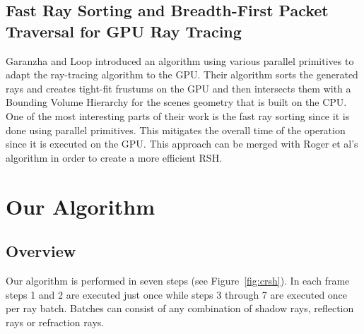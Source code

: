 \documentclass{egpubl}
\begin{document}
\subsection{Fast Ray Sorting and Breadth-First Packet Traversal for GPU Ray Tracing}

Garanzha and Loop \cite{Garanzha10} introduced an algorithm using various parallel primitives to adapt the ray-tracing algorithm to the GPU. Their algorithm sorts the generated rays and creates tight-fit frustums on the GPU and then intersects them with a Bounding Volume Hierarchy for the scenes geometry that is built on the CPU. One of the most interesting parts of their work is the fast ray sorting since it is done using parallel primitives. This mitigates the overall time of the operation since it is executed on the GPU. This approach can be merged with Roger et al's \cite{Roger07} algorithm in order to create a more efficient RSH.


\section{Our Algorithm} 

\subsection{Overview}

Our algorithm is performed in seven steps (see Figure~\ref{fig:crsh}). In each frame steps 1 and 2 are executed just once while steps 3 through 7 are executed once per ray batch. Batches can consist of any combination of shadow rays, reflection rays or refraction rays.
\end{document}
